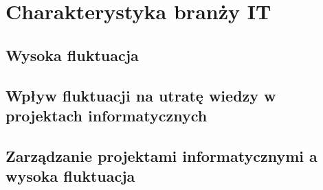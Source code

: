 \chapter{Charakterystyka branży IT}\label{ch:it-sector}
\section{Wysoka fluktuacja}\label{sec:it-turnover}

\section{Wpływ fluktuacji na utratę wiedzy w projektach informatycznych}\label{sec:it-knowledge-loss}
\todo{}

\section{Zarządzanie projektami informatycznymi a wysoka fluktuacja}\label{sec:it-project-management}

\thispagestyle{normal}
